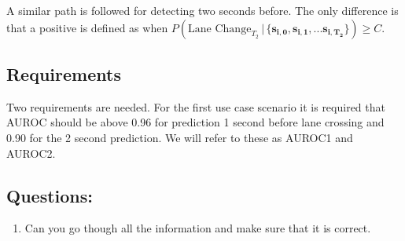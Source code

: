 \documentclass{article}
\theoremstyle{theorem}
\theoremstyle{definition}
\newcommand{\bv}[1]{\bm{#1}}
\begin{document}
A similar path is followed for detecting two seconds before.  The only difference is that a positive is defined as when  $P(\mbox{Lane Change}_{T_2} \,|\, \{ \bv{s_{i,0}}, \bv{s_{i,1}}, ... \bv{s_{i,T_2}} \}) \geq C$.

\subsection*{Requirements}
Two requirements are needed.  For the first use case scenario it is required that AUROC should be above 0.96 for prediction 1 second before lane crossing and 0.90 for the 2 second prediction.  We will refer to these as AUROC1 and AUROC2.  

\subsection*{Questions: }
\begin{enumerate}
\item Can you go though all the information and make sure that it is correct.
\end{enumerate}


%
%
%
%



\end{document}
